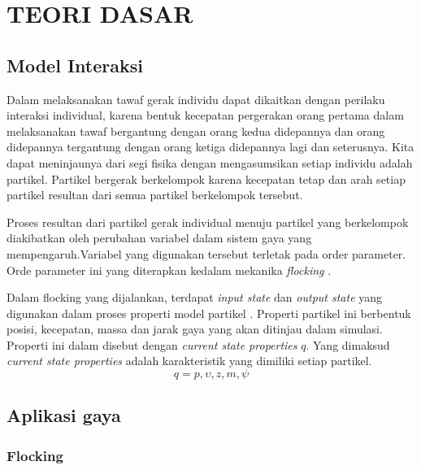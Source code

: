 %
%
%
\chapter{TEORI DASAR}\label{cha:teori}


\section{Model Interaksi}\label{sec:modelinteraksi}
\hspace {0.5cm}Dalam melaksanakan tawaf gerak individu dapat dikaitkan dengan perilaku interaksi individual, karena bentuk kecepatan pergerakan orang pertama dalam melaksanakan tawaf bergantung dengan orang kedua didepannya dan orang didepannya tergantung dengan orang ketiga didepannya lagi dan seterusnya. Kita dapat meninjaunya dari segi fisika dengan mengasumsikan setiap individu adalah partikel. Partikel bergerak berkelompok karena kecepatan tetap dan arah setiap partikel resultan dari semua partikel berkelompok tersebut.

\hspace {0.5cm}Proses resultan dari partikel gerak individual menuju partikel yang berkelompok diakibatkan oleh perubahan variabel dalam sistem gaya yang mempengaruh.Variabel yang digunakan tersebut terletak pada order parameter. Orde parameter ini yang diterapkan kedalam mekanika \textit{flocking} .

\hspace {0.5cm}Dalam flocking yang dijalankan, terdapat \textit{input state} dan \textit{output state} yang digunakan dalam proses properti model partikel . Properti partikel ini berbentuk posisi, kecepatan, massa dan jarak gaya yang akan ditinjau dalam simulasi. Properti ini dalam \citep{Bajec2007} disebut dengan \textit{current state properties}  $q$. Yang dimaksud \textit{current state properties} adalah karakteristik yang dimiliki setiap partikel.
\begin{equation}
q = {p,\upsilon,z,m,\psi} 
\end{equation}



\section{Aplikasi gaya}\label{cha:aplikasi gaya}
\subsection{Flocking}\label{sec:flocking}

